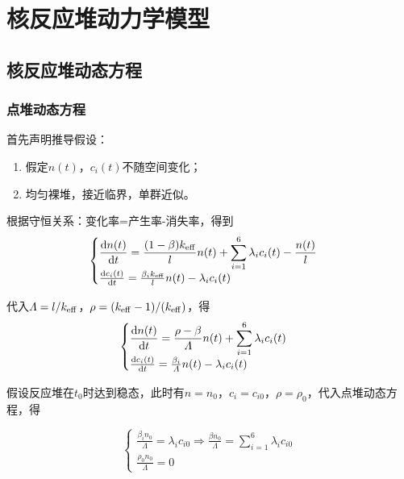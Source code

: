 \section{核反应堆动力学模型}

\subsection{核反应堆动态方程}

\subsubsection{点堆动态方程}

首先声明推导假设：
\begin{enumerate}
    \item 假定$n(t)$，$c_i(t)$不随空间变化；
    \item 均匀裸堆，接近临界，单群近似。
\end{enumerate}

根据守恒关系：变化率=产生率-消失率，得到
\begin{equation}
    \begin{cases} \displaystyle
        \frac{{\rm{d}}{n(t)}}{{\rm{d}}{t}} = \frac{(1-\beta)k_{\rm eff}}{l} n(t) + \sum_{i=1}^{6} \lambda_i c_i(t) - \frac{n(t)}{l} \\
        \frac{{\rm{d}}{c_i(t)}}{{\rm{d}}{t}} = \frac{\beta_i k_{\rm eff}}{l} n(t) - \lambda_i c_i(t)
    \end{cases}
\end{equation}

代入$\varLambda = l / k_{\rm eff}$，$\rho = (k_{\rm eff} - 1) / (k_{\rm eff})$，得
\begin{equation}
    \begin{cases} \displaystyle
        \frac{{\rm{d}}{n(t)}}{{\rm{d}}{t}} = \frac{\rho - \beta}{\varLambda} n(t) + \sum_{i=1}^{6} \lambda_i c_i(t) \\
        \frac{{\rm{d}}{c_i(t)}}{{\rm{d}}{t}} = \frac{\beta_i}{\varLambda} n(t) - \lambda_i c_i(t)
    \end{cases}
\end{equation}


假设反应堆在$t_0$时达到稳态，此时有$n = n_0$，$c_i = c_{i0}$，$\rho = \rho_0$，代入点堆动态方程，得

\begin{equation}
    \begin{cases} \displaystyle
        \frac{\beta_i n_0}{\varLambda} = \lambda_i c_{i0} \Rightarrow \frac{\beta n_0}{\varLambda} = \sum_{i=1}^{6} \lambda_i c_{i0} \\
        \frac{\rho_0 n_0}{\varLambda} = 0
    \end{cases}
\end{equation}

